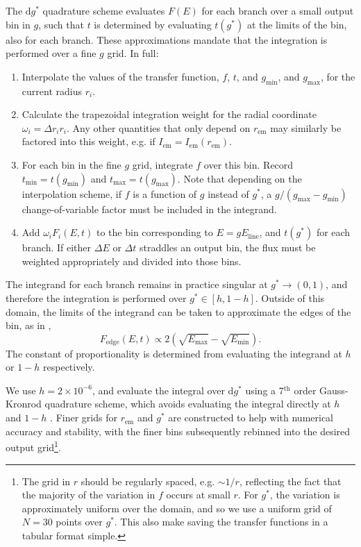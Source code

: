 \documentclass[fleqn,usenatbib]{mnras}
\renewcommand{\d}{\text{d}}
\begin{document}
The $\d g^\ast$ quadrature scheme evaluates $F(E)$ for each branch over a small
output bin in $g$, such that $t$ is determined by evaluating $t(g^\ast)$ at the
limits of the bin, also for each branch. These approximations mandate that the
integration is performed over a fine $g$ grid. In full:
\begin{enumerate}
    \item Interpolate the values of the transfer function, $f$, $t$, and
        $g_\text{min}$, and $g_\text{max}$, for the current radius $r_i$.
    \item Calculate the trapezoidal integration weight for the radial coordinate
        $\omega_i = \Delta r_i r_i$. Any other quantities that only depend on
        $r_\text{em}$ may similarly be factored into this weight, e.g. if
        $I_\text{em} = I_\text{em}(r_\text{em})$.
    \item For each bin in the fine $g$ grid, integrate $f$ over this bin. Record
        $t_\text{min} = t(g_\text{min})$ and $t_\text{max} = t(g_\text{max})$.
        Note that depending on the interpolation scheme, if $f$ is a function of
        $g$ instead of $g^\ast$, a $g / (g_\text{max} - g_\text{min})$
        change-of-variable factor must be included in the integrand.
    \item Add $\omega_i F_i(E, t)$ to the bin corresponding to $E =
        gE_\text{line}$, and $t(g^\ast)$ for each branch. If either $\Delta E$
        or $\Delta t$ straddles an output bin, the flux must be weighted
        appropriately and divided into those bins.
\end{enumerate}

The integrand for each branch remains in practice singular at $g^\ast
\rightarrow (0, 1)$, and therefore the integration is performed over $g^\ast \in
[h, 1 - h]$. Outside of this domain, the limits of the integrand can be taken to
approximate the edges of the bin, as in \cite{dauser_broad_2010},
\begin{equation} F_\text{edge}(E,t) \propto 2\left( \sqrt{E_\text{max}} -
\sqrt{E_\text{min}} \right).  \end{equation} The constant of proportionality is
determined from evaluating the integrand at $h$ or $1 - h$ respectively.

We use $h = 2 \times 10^{-6}$, and evaluate the integral over $\d g^\ast$ using
a 7$^\text{th}$ order Gauss-Kronrod quadrature scheme, which avoids evaluating
the integral directly at $h$ and $1 - h$ \citep{}. Finer grids for $r_\text{em}$
and $g^\ast$ are constructed to help with numerical accuracy and stability, with
the finer bins subsequently rebinned into the desired output grid\footnote{The
    grid in $r$ should be regularly spaced, e.g. $\sim 1 / r$, reflecting the
    fact that the majority of the variation in $f$ occurs at small $r$. For
$g^\ast$, the variation is approximately uniform over the domain, and so we use
a uniform grid of $N = 30$ points over $g^\ast$. This also make saving the
transfer functions in a tabular format simple.  }.
\end{document}
